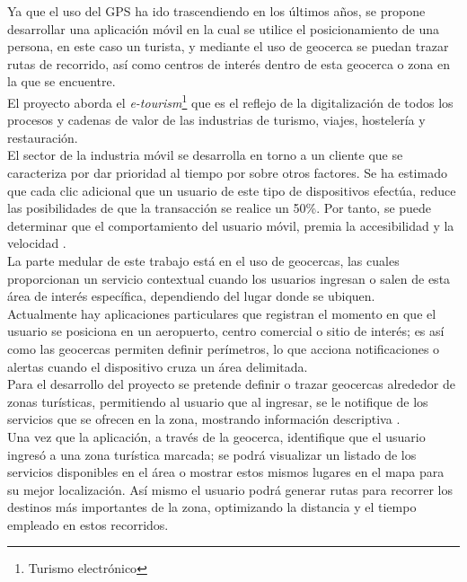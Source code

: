 \vspace*{7cm}
\rightline{{\Huge \textcolor{sectionColor}{Justificación}}}
\vspace*{2cm}


Ya que el uso del GPS ha ido trascendiendo en los últimos años, se propone desarrollar una aplicación móvil en la cual se utilice el posicionamiento de una persona, en este caso un turista, y mediante el uso de geocerca se puedan trazar rutas de recorrido, así como centros de interés dentro de esta geocerca o zona en la que se encuentre. \\

El proyecto aborda el \textit{e-tourism}\footnote{Turismo electrónico} que es el reflejo de la digitalización de todos los procesos y cadenas de valor de las industrias de turismo, viajes, hostelería y restauración. \\

El sector de la industria móvil se desarrolla en torno a un cliente que se caracteriza por dar prioridad al tiempo por sobre otros factores. Se ha estimado que cada clic adicional que un usuario de este tipo de dispositivos efectúa, reduce las posibilidades de que la transacción se realice un 50\%. Por tanto, se puede determinar que el comportamiento del usuario móvil, premia la accesibilidad y la velocidad \cite{mtourism}. \\

La parte medular de este trabajo está en el uso de geocercas, las cuales proporcionan un servicio contextual cuando los usuarios ingresan o salen de esta área de interés específica, dependiendo del lugar donde se ubiquen. \\

Actualmente hay aplicaciones particulares que registran el momento en que el usuario se posiciona en un aeropuerto, centro comercial o sitio de interés; es así como las geocercas permiten definir perímetros, lo que acciona notificaciones o alertas cuando el dispositivo cruza un área delimitada.\\

Para el desarrollo del proyecto se pretende definir o trazar geocercas alrededor de zonas turísticas, permitiendo al usuario que al ingresar, se le notifique de los servicios que se ofrecen en la zona, mostrando información descriptiva \cite{mtourism}.\\

Una vez que la aplicación, a través de la geocerca, identifique que el usuario ingresó a una zona turística marcada; se podrá visualizar un listado de los servicios disponibles en el área o mostrar estos mismos lugares en el mapa para su mejor localización. Así mismo el usuario podrá generar rutas para recorrer los destinos más importantes de la zona, optimizando la distancia y el tiempo empleado en estos recorridos.\\

